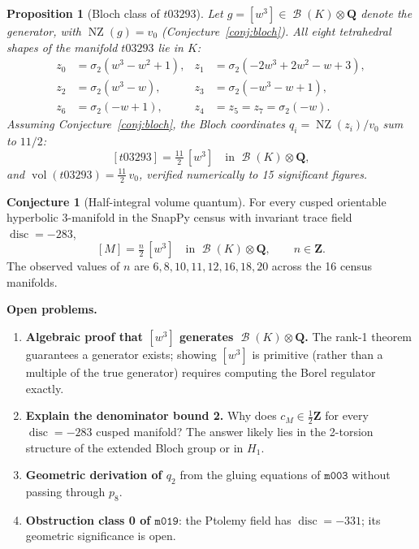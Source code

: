 \documentclass[12pt]{amsart}
\newtheorem{proposition}[theorem]{Proposition}
\theoremstyle{definition}
\newtheorem{conjecture}[theorem]{Conjecture}
\newcommand{\QQ}{\mathbf{Q}}
\newcommand{\ZZ}{\mathbf{Z}}
\DeclareMathOperator{\disc}{disc}
\DeclareMathOperator{\vol}{vol}
\DeclareMathOperator{\NZ}{NZ}
\DeclareMathOperator{\Bloch}{\mathcal{B}}
\newcommand{\M}{\texttt{m003}}
\newcommand{\mzero}{\texttt{m019}}
\begin{document}
\begin{proposition}[Bloch class of $t03293$]\label{prop:bloch-t03293}
Let $g = [w^3] \in \Bloch(K)\otimes\QQ$ denote the generator,
with $\NZ(g) = v_0$ (Conjecture~\ref{conj:bloch}).
All eight tetrahedral shapes of the manifold $t03293$ lie in $K$:
\begin{align*}
  z_0 &= \sigma_2(w^3-w^2+1), &
  z_1 &= \sigma_2(-2w^3+2w^2-w+3),\\
  z_2 &= \sigma_2(w^3-w), &
  z_3 &= \sigma_2(-w^3-w+1),\\
  z_6 &= \sigma_2(-w+1), &
  z_4 &= z_5 = z_7 = \sigma_2(-w).
\end{align*}
Assuming Conjecture~\ref{conj:bloch}, the Bloch coordinates
$q_i = \NZ(z_i)/v_0$ sum to $11/2$:
\[
  [t03293] = \tfrac{11}{2}\,[w^3]
  \quad\text{in } \Bloch(K)\otimes\QQ,
\]
and $\vol(t03293) = \tfrac{11}{2}\,v_0$,
verified numerically to 15 significant figures.
\end{proposition}

\begin{conjecture}[Half-integral volume quantum]\label{conj:half-int}
For every cusped orientable hyperbolic 3-manifold in the
SnapPy census with invariant trace field $\disc = -283$,
\[
  [M] = \tfrac{n}{2}\,[w^3]
  \quad\text{in } \Bloch(K)\otimes\QQ,
  \qquad n \in \ZZ.
\]
The observed values of $n$ are
$6, 8, 10, 11, 12, 16, 18, 20$ across the 16 census manifolds.
\end{conjecture}

\medskip
\noindent\textbf{Open problems.}

\begin{enumerate}
\item \textbf{Algebraic proof that $[w^3]$ generates $\Bloch(K)\otimes\QQ$.}
  The rank-1 theorem guarantees a generator exists; showing
  $[w^3]$ is primitive (rather than a multiple of the true generator)
  requires computing the Borel regulator exactly.
\item \textbf{Explain the denominator bound 2.}
  Why does $c_M \in \tfrac{1}{2}\ZZ$ for every $\disc = -283$
  cusped manifold? The answer likely lies in the 2-torsion
  structure of the extended Bloch group or in $H_1$.
\item \textbf{Geometric derivation of $q_2$} from the gluing equations
  of $\M$ without passing through $p_8$.
\item \textbf{Obstruction class 0 of $\mzero$}: the Ptolemy field has
  $\disc = -331$; its geometric significance is open.
\end{enumerate}
\end{document}

